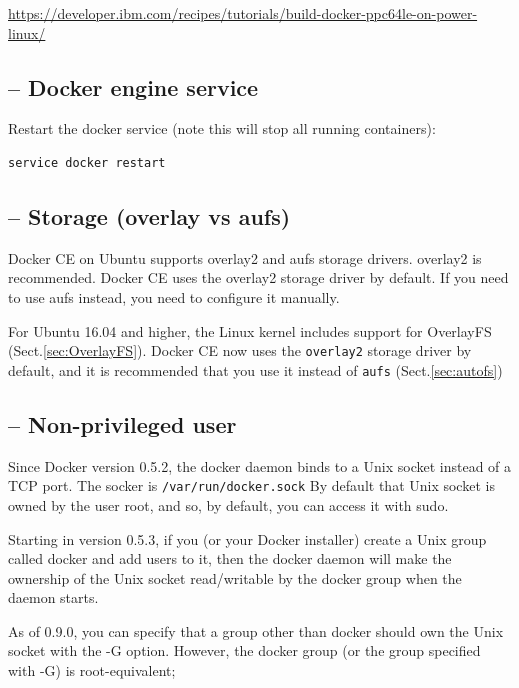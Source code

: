 \url{https://developer.ibm.com/recipes/tutorials/build-docker-ppc64le-on-power-linux/}



\subsection{-- Docker engine service}


Restart the docker service (note this will stop all running containers):
\begin{verbatim}
service docker restart
\end{verbatim}

\subsection{-- Storage (overlay vs aufs)}
\label{sec:Docker-storage-access}

Docker CE on Ubuntu supports overlay2 and aufs storage drivers.
overlay2 is recommended. Docker CE uses the overlay2 storage driver by default.
If you need to use aufs instead, you need to configure it manually.

For Ubuntu 16.04 and higher, the Linux kernel includes support for OverlayFS
(Sect.\ref{sec:OverlayFS}).
Docker CE now uses the \verb!overlay2! storage driver by default, and it is
recommended that you use it instead of \verb!aufs! (Sect.\ref{sec:autofs})






\subsection{-- Non-privileged user}
\label{sec:Docker-howto}


Since Docker version 0.5.2, the docker daemon binds to a Unix socket instead of
a TCP port. The socker is \verb!/var/run/docker.sock!
By default that Unix socket is owned by the user root, and so, by
default, you can access it with sudo.

Starting in version 0.5.3, if you (or your Docker installer) create a Unix group
called docker and add users to it, then the docker daemon will make the
ownership of the Unix socket read/writable by the docker group when the daemon
starts.

As of 0.9.0, you can specify that a group other than docker should own the Unix
socket with the -G option. 
However, the docker group (or the group specified with -G) is root-equivalent;

